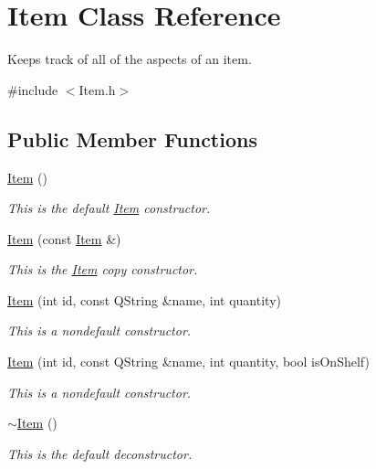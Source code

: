 \hypertarget{class_item}{}\section{Item Class Reference}
\label{class_item}


Keeps track of all of the aspects of an item.  




{\ttfamily \#include $<$Item.\+h$>$}

\subsection*{Public Member Functions}
\begin{DoxyCompactItemize}
\item 
\hyperlink{class_item_a297720c02984eab37332ae795d22189d}{Item} ()
\begin{DoxyCompactList}\small\item\em This is the default \hyperlink{class_item}{Item} constructor. \end{DoxyCompactList}\item 
\hyperlink{class_item_afc899efe46f7dc6d85e461cb2ca9ebaf}{Item} (const \hyperlink{class_item}{Item} \&)
\begin{DoxyCompactList}\small\item\em This is the \hyperlink{class_item}{Item} copy constructor. \end{DoxyCompactList}\item 
\hyperlink{class_item_a344bcf40797aec4d8504b5eeb116d03d}{Item} (int id, const Q\+String \&name, int quantity)
\begin{DoxyCompactList}\small\item\em This is a nondefault constructor. \end{DoxyCompactList}\item 
\hyperlink{class_item_ad0cc8be6fae78de7c88f937265fcf9de}{Item} (int id, const Q\+String \&name, int quantity, bool is\+On\+Shelf)
\begin{DoxyCompactList}\small\item\em This is a nondefault constructor. \end{DoxyCompactList}\item 
\hyperlink{class_item_a11663c84075b78c3ae5e30fdfcd7c458}{$\sim$\+Item} ()
\begin{DoxyCompactList}\small\item\em This is the default deconstructor. \end{DoxyCompactList}\item 

\end{DoxyCompactItemize}
